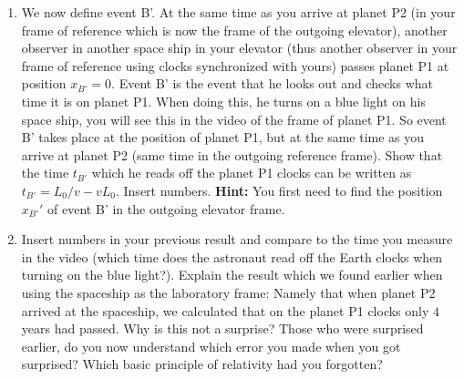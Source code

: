 {\begin{multicols}{2}
\begin{enumerate}
\item We now define event B'. At the same time as you arrive at planet P2  (in your frame of reference which is now the frame of the outgoing elevator), another observer in another space ship in your elevator (thus another observer in your frame of reference using clocks synchronized with yours) passes planet P1 at position $x_{B'}=0$. Event B' is the event that he looks out and checks what time it is on planet P1. When doing this, he turns on a blue light on his space ship, you will see this in the video of the frame of planet P1. So event B' takes place at the position of planet P1, but at the same time as you arrive at planet P2 (same time in the outgoing reference frame). Show that the time $t_{B'}$ which he reads off the planet P1 clocks can be written as $t_{B'}=L_0/v-vL_0$. Insert numbers. {\bf Hint:} You first need to find the position $x_{B'}'$ of event B' in the outgoing elevator frame.
\item Insert numbers in your previous result and compare to the time you measure in the video (which time does the astronaut read off the Earth clocks when turning on the blue light?). Explain the result which we found earlier when using the spaceship as the laboratory frame: Namely that when planet P2 arrived at the spaceship, we calculated that on the planet P1 clocks only $4$ years had passed. Why is this not a surprise? Those who were surprised earlier, do you now understand which error you made when you got surprised? Which basic principle of relativity had you forgotten?

\end{enumerate}
\end{multicols}}
